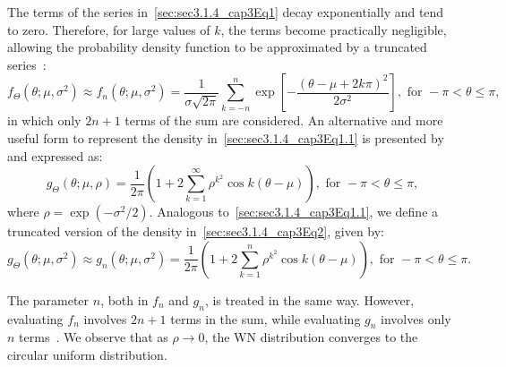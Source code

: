 \documentclass[remotesensing,article,submit,pdftex,moreauthors]{Definitions/mdpi}
\begin{document}
The terms of the series in~\eqref{sec:sec3.1.4_cap3Eq1} decay exponentially and tend to zero. 
Therefore, for large values of $k$, the terms become practically negligible, allowing the probability density function to be approximated by a truncated series~\cite{EfficientEvaluationoftheProbabilityDensityFunctionofaWrappedNormalDistribution}: 
\begin{equation}	f_{\Theta}(\theta; \mu, \sigma^2)
	\approx f_n(\theta; \mu, \sigma^2) 
	=\frac{1}{\sigma\sqrt{2\pi}}\sum_{k=-n}^{n}\exp\left[-\frac{(\theta-\mu+2k\pi)^2}{2\sigma^2}\right], \text{ for }-\pi < \theta \leq \pi, \label{sec:sec3.1.4_cap3Eq1.1}
\end{equation}
in which only $2n + 1$ terms of the sum are considered. An alternative and more useful form to represent the density in~\eqref{sec:sec3.1.4_cap3Eq1.1} is presented by~\cite{CircularStatisticsinR, EfficientEvaluationoftheProbabilityDensityFunctionofaWrappedNormalDistribution} and expressed as:
\begin{equation}\label{sec:sec3.1.4_cap3Eq2}
	g_{\Theta}(\theta; \mu, \rho)=\frac{1}{2\pi}\left(1+2\sum_{k=1}^{\infty}\rho^{k^2}\cos k(\theta-\mu) \right), \text{ for } -\pi < \theta \leq \pi,
\end{equation}
where $\rho = \exp(-\sigma^2/2)$. Analogous to~\eqref{sec:sec3.1.4_cap3Eq1.1}, we define a truncated version of the density in~\eqref{sec:sec3.1.4_cap3Eq2}, given by:
\begin{equation}\label{sec:sec3.1.4_cap3Eq2.1}
	g_{\Theta}(\theta; \mu, \sigma^2)
\approx g_n(\theta; \mu, \sigma^2) = \frac{1}{2\pi}\left(1+2\sum_{k=1}^{n}\rho^{k^2}\cos k(\theta-\mu) \right), \text{ for }-\pi < \theta \leq \pi.
\end{equation}

The parameter $n$, both in $f_n$ and $g_n$, is treated in the same way.
However, evaluating $f_n$ involves $2n + 1$ terms in the sum, while evaluating $g_n$ involves only $n$ terms~\cite{EfficientEvaluationoftheProbabilityDensityFunctionofaWrappedNormalDistribution}. 
We observe that as $\rho\rightarrow0$, the WN distribution converges to the circular uniform distribution.
\end{document}
